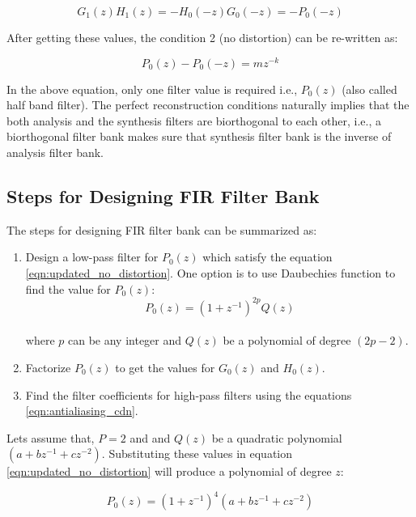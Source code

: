 \begin{equation} 
{G_{1}(z)H_{1}(z) = -H_{0}(-z)G_{0}(-z) = -P_0(-z)}
\end{equation}

After getting these values, the condition 2 (no distortion) can be re-written as:

\begin{equation}\label{eqn:updated_no_distortion} 
{P_0(z) - P_0(-z) =  mz^{-k}}
\end{equation}

In the above equation, only one filter value is required i.e., $P_0(z)$ (also called half band filter). The perfect reconstruction conditions naturally implies that the both analysis and the synthesis filters are biorthogonal to each other, i.e., a biorthogonal filter bank makes sure that synthesis filter bank is the inverse of analysis filter bank.


\subsection{Steps for Designing FIR Filter Bank}
The steps for designing FIR filter bank can be summarized as:

\begin{enumerate}
	\item Design a low-pass filter for $P_0(z)$ which satisfy the equation \ref{eqn:updated_no_distortion}. One option is to use Daubechies function to find the value for $P_0(z)$: \\ 
	\begin{equation}\label{eqn:updated_no_distortion} 
	{P_0(z) = (1 + z^{-1})^{2p}Q(z)}
	\end{equation} \\
	where $p$ can be any integer and $Q(z)$ be a polynomial of degree $(2p-2)$.
	\item Factorize $P_0(z)$ to get the values for $G_0(z)$ and $H_0(z)$.
	\item Find the filter coefficients for high-pass filters using the equations \ref{eqn:antialiasing_cdn}. 
\end{enumerate}


Lets assume that, $P=2$ and and $Q(z)$ be a quadratic polynomial $(a + bz^{-1} + cz^{-2})$. Substituting these values in equation \ref{eqn:updated_no_distortion} will produce a polynomial of degree $z$:

\begin{equation} 
{P_0(z) = (1 + z^{-1})^4(a + bz^{-1} + cz^{-2})}
\end{equation}


